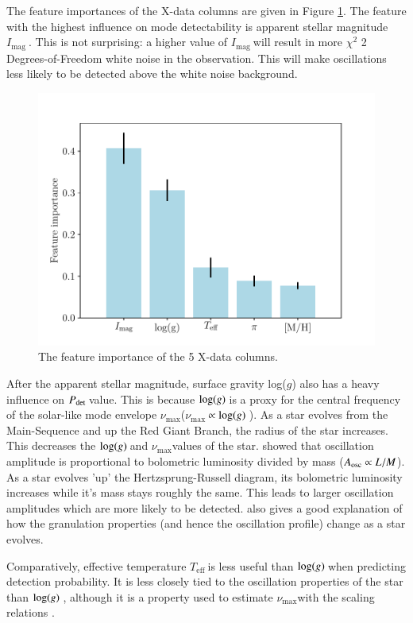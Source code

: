 \documentclass[a4paper,fleqn,usenatbib,useAMS]{mnras}
\newcommand{\numax}{\ensuremath{\nu_{\textrm{max}}}}
\newcommand{\teff}{\ensuremath{T_{\textrm{eff}}\:}}
\newcommand{\pdet}{\ensuremath{P_{\rm det}\:}}
\newcommand{\imag}{\ensuremath{I_{\textrm{mag}}\:}}
\newcommand{\logg}{\ensuremath{{\rm log}(g)\:}}
\begin{document}
The feature importances of the X-data columns are given in Figure \ref{fig:feature}. The feature with the highest influence on mode detectability is apparent stellar magnitude \imag. This is not surprising: a higher value of \imag will result in more $\chi^{2}$ 2 Degrees-of-Freedom white noise in the observation. This will make oscillations less likely to be detected above the white noise background.
\begin{figure}
	\centering
	\includegraphics[scale=0.5]{Plot1_featureimportance.pdf}
	\caption{The feature importance of the 5 X-data columns.}	
	\label{fig:feature}
\end{figure}

After the apparent stellar magnitude, surface gravity log($g$) also has a heavy influence on \pdet value. This is because \logg is a proxy for the central frequency of the solar-like mode envelope \numax \:(\numax $\: \propto\logg$). As a star evolves from the Main-Sequence and up the Red Giant Branch, the radius of the star increases. This decreases the \logg and \numax values of the star. \citet{kjeldsen_amplitudes_1995} showed that oscillation amplitude is proportional to bolometric luminosity divided by mass ($A_{\rm osc} \propto L/M$). As a star evolves 'up' the Hertzsprung-Russell diagram, its bolometric luminosity increases while it's mass stays roughly the same. This leads to larger oscillation amplitudes which are more likely to be detected. \citet{mathur_granulation_2011} also gives a good explanation of how the granulation properties (and hence the oscillation profile) change as a star evolves. 

Comparatively, effective temperature \teff is less useful than \logg when predicting detection probability. It is less closely tied to the oscillation properties of the star than \logg, although it is a property used to estimate \numax with the scaling relations \citep{chaplin_predicting_2011}. 
\end{document}
